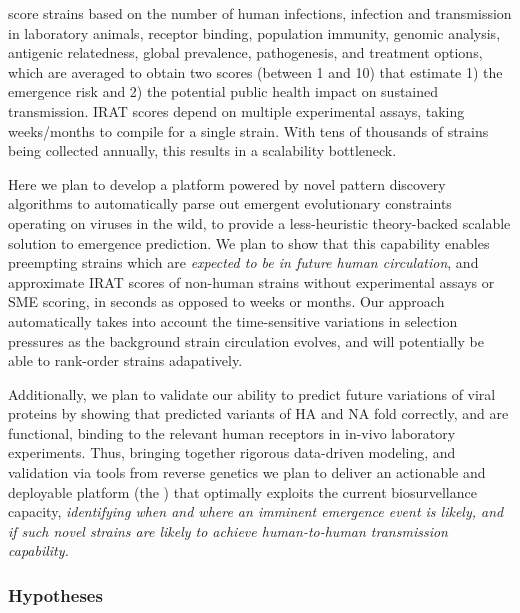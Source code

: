 \documentclass[onecolumn, compsoc,12pt]{IEEEtran}
\begin{document}
  score strains based on  the number of  human infections, infection and transmission in laboratory animals, receptor binding, population immunity, genomic analysis, antigenic relatedness, global prevalence,  pathogenesis, and  treatment options, which are averaged to obtain two scores (between 1 and 10) that  estimate 1) the emergence  risk and 2) the potential public health impact on sustained transmission. IRAT scores  depend on multiple experimental assays,  taking  weeks/months to compile for a single strain. With tens of   thousands of strains being collected annually, this results in  a scalability bottleneck.

Here we plan to develop a platform powered by novel pattern discovery  algorithms to automatically parse out emergent evolutionary constraints operating on \infl viruses in the wild, to provide a less-heuristic theory-backed scalable solution to emergence prediction. We plan to show   that this capability enables preempting  strains which are \textit{expected to be in future human circulation}, and  approximate IRAT scores of non-human strains without  experimental assays or SME scoring, in seconds as opposed to weeks or months. Our approach automatically takes into account the time-sensitive variations in selection pressures as the background strain circulation evolves, and will potentially be able to rank-order strains adapatively.

Additionally, we plan to validate our ability to predict future variations of viral proteins by showing that predicted variants of HA and NA fold correctly, and are functional, binding to the relevant human receptors in in-vivo laboratory experiments. Thus, bringing together rigorous data-driven modeling, and validation via tools from reverse genetics we plan to deliver an actionable and deployable platform (the \bnd) that optimally exploits the current biosurvellance capacity,  \textit{identifying when and where an imminent  emergence event is likely, and if such novel strains are likely to achieve human-to-human transmission capability.}

  


\subsubsection*{Hypotheses} %
\end{document}
